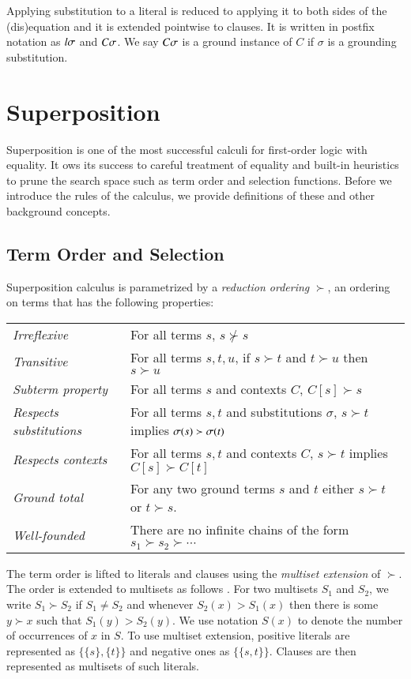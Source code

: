 Applying substitution to a literal is reduced to applying it to both sides of
the (dis)equa\-tion and it is extended pointwise to clauses. It is written in
postfix notation as $l\sigma$ and $C\sigma$. We say $C\sigma$ is a
ground instance of $C$ if $\sigma$ is a grounding substitution.

\section{Superposition}

Superposition is one of the most successful calculi for first-order logic with
equality. It ows its success to careful treatment of equality and built-in
heuristics to prune the search space such as term order and selection functions.
Before we introduce the rules of the calculus, we provide definitions of these and other
background concepts.

\subsection{Term Order and Selection}

Superposition calculus is parametrized by a {\em reduction ordering} $\succ$, an
ordering on terms that has the following properties:

\noindent\begin{tabular}{p{}p{}}
    \textit{Irreflexive} & For all terms $s$, $s \not\succ s$ \\
    \textit{Transitive} & For all terms $s, t, u$,  if $s\succ t$ and $t \succ u$ then $s \succ u$ \\ 
    \textit{Subterm property} & For all terms $s$ and contexts $C$, $C[s] \succ s$ \\
    \textit{Respects substitutions} & For all terms $s, t$ and substitutions $\sigma$, $s \succ t$ implies $\sigma(s) \succ \sigma(t)$ \\
    \textit{Respects contexts} & For all terms $s,t$ and contexts $C$, $s \succ t$ implies $C[s] \succ C[t]$ \\
    \textit{Ground total} & For any two
    ground terms $s$ and $t$ either $s \succ t$ or $t \succ s$. \\
    \textit{Well-founded} & There are no infinite chains of the form $s_1 \succ s_2 \succ \cdots$ 
\end{tabular}

The term order is lifted to literals and clauses using the {\em multiset extension} of
$\succ$. The order is extended to multisets as follows
\cite[Sect.~2.5]{bg-01-resolution}. For two multisets $S_1$ and $S_2$, we write $S_1 \succ S_2$ if $S_1 \not= S_2$
and whenever $S_2(x) > S_1(x)$ then there is some $y \succ x$ such that $S_1(y)
> S_2(y)$. We use notation $S(x)$ to denote the number of occurrences of $x$ in
$S$. To use multiset extension, positive literals are represented as $ \{ \{s\},
\{t\} \}$ and negative ones as $\{ \{ s, t \} \}$. Clauses are then represented as 
multisets of such literals. 

